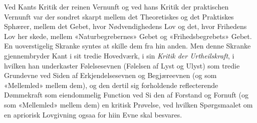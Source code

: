 \documentclass[12pt,a4paper]{book}
\begin{document}
Ved Kants Kritik der reinen Vernunft og ved hans Kritik
der praktischen Vernunft var der sondret skarpt mellem det
Theoretiskes og det Praktiskes Sphærer, mellem det Gebet,
hvor Nødvendighedens Lov og det, hvor Frihedens Lov her\-%
skede, mellem «Naturbegrebernes» Gebet og «Frihedsbegrebets»
Gebet. En uoverstigelig Skranke syntes at skille dem fra hin\-%
anden. Men denne Skranke gjennembryder Kant i sit tredie
Hovedværk, i sin \emph{Kritik der Urtheilskraft}, i hvilken han
underkaster Følelsesevnen (Følelsen af Lyst og Ulyst) som tredie
Grundevne ved Siden af Erkjendelsesevnen og Begjæreevnen
(og som «Mellemled» mellem dem), og den dertil sig forholdende
reflecterende Dømmekraft som eiendommelig Function ved Si\-%
den af Forstand og Fornuft (og som «Mellemled» mellem dem)
en kritisk Prøvelse, ved hvilken Spørgsmaalet om en apriorisk
Lovgivning ogsaa for hiin Evne skal besvares.
\end{document}
